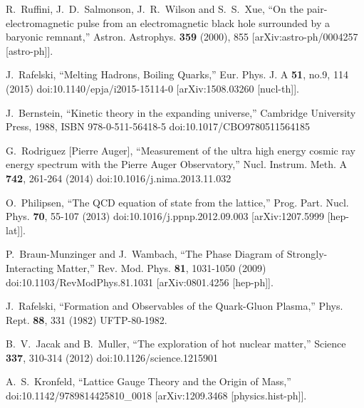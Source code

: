 \documentclass[universe,article,submit,moreauthors,pdftex,a4paper]{Definitions/mdpi}
\begin{document}
\begin{thebibliography}{99}
R.~Ruffini, J.~D.~Salmonson, J.~R.~Wilson and S.~S.~Xue,
``On the pair-electromagnetic pulse from an electromagnetic black hole surrounded by a baryonic
remnant,''
Astron. Astrophys. \textbf{359} (2000), 855
[arXiv:astro-ph/0004257 [astro-ph]].

J.~Rafelski,
``Melting Hadrons, Boiling Quarks,''
Eur. Phys. J. A \textbf{51}, no.9, 114 (2015)
doi:10.1140/epja/i2015-15114-0
[arXiv:1508.03260 [nucl-th]].

J.~Bernstein,
``Kinetic theory in the expanding universe,''
Cambridge University Press, 1988,
ISBN 978-0-511-56418-5
doi:10.1017/CBO9780511564185

G.~Rodriguez [Pierre Auger],
``Measurement of the ultra high energy cosmic ray energy spectrum with the Pierre Auger Observatory,''
Nucl. Instrum. Meth. A \textbf{742}, 261-264 (2014)
doi:10.1016/j.nima.2013.11.032

O.~Philipsen,
``The QCD equation of state from the lattice,''
Prog. Part. Nucl. Phys. \textbf{70}, 55-107 (2013)
doi:10.1016/j.ppnp.2012.09.003
[arXiv:1207.5999 [hep-lat]].

P.~Braun-Munzinger and J.~Wambach,
``The Phase Diagram of Strongly-Interacting Matter,''
Rev. Mod. Phys. \textbf{81}, 1031-1050 (2009)
doi:10.1103/RevModPhys.81.1031
[arXiv:0801.4256 [hep-ph]].

J.~Rafelski,
``Formation and Observables of the Quark-Gluon Plasma,''
Phys. Rept. \textbf{88}, 331 (1982)
UFTP-80-1982.

B.~V.~Jacak and B.~Muller,
``The exploration of hot nuclear matter,''
Science \textbf{337}, 310-314 (2012)
doi:10.1126/science.1215901

A.~S.~Kronfeld,
``Lattice Gauge Theory and the Origin of Mass,''
doi:10.1142/9789814425810\_0018
[arXiv:1209.3468 [physics.hist-ph]].


\end{thebibliography}
\end{document}

